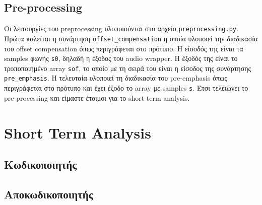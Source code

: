 \documentclass{article}
\begin{document}
\subsection{Pre-processing}
Οι λειτουργίες του preprocessing υλοποιούνται στο αρχείο 
\verb|preprocessing.py|. Πρώτα καλείται η συνάρτηση \verb|offset_compensation|
η οποία υλοποιεί την διαδικασία του offset compensation όπως περιγράφεται στο 
πρότυπο. Η είσοδός της είναι τα samples φωνής \verb|s0|, δηλαδή η έξοδος του 
audio wrapper. Η έξοδός της είναι το τροποποιημένο array \verb|sof|, το οποίο 
με τη σειρά του είναι η είσοδος της συνάρτησης \verb|pre_emphasis|. Η τελευταία
υλοποιεί τη διαδικασία του pre-emphasis όπως περιγράφεται στο πρότυπο και έχει 
έξοδο το array με samples \verb|s|. Έτσι τελειώνει το pre-processing και είμαστε
έτοιμοι για το short-term analysis.


\section{Short Term Analysis} 
\subsection{Κωδικοποιητής}
\subsection{Αποκωδικοποιητής}
\end{document}
